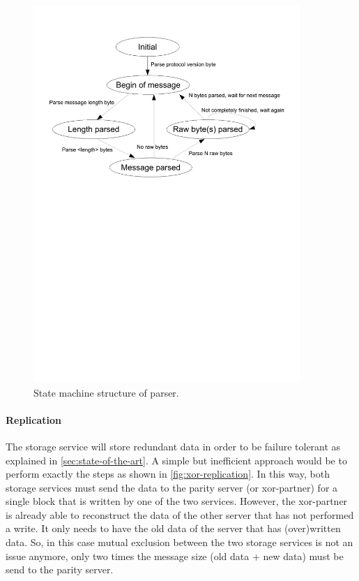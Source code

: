 \documentclass[12pt,a4paper]{scrartcl}
\begin{document}
\begin{figure}[H]
\centering
\includegraphics[width=0.9\textwidth,trim=0 16cm 0 1cm,clip=true]{diagrams/parser-statemachine.pdf}
\caption{State machine structure of parser.}
\label{fig:parser-statemachine}
\end{figure}

\paragraph{Replication}
The storage service will store redundant data in order to be failure tolerant as explained in \autoref{sec:state-of-the-art}. A simple but inefficient approach would be to perform exactly the steps as shown in \autoref{fig:xor-replication}. In this way, both storage services must send the data to the parity server (or xor-partner) for a single block that is written by one of the two services. However, the xor-partner is already able to reconstruct the data of the other server that has not performed a write. It only needs to have the old data of the server that has (over)written data. So, in this case mutual exclusion between the two storage services is not an issue anymore, only two times the message size (old data + new data) must be send to the parity server.
\end{document}

